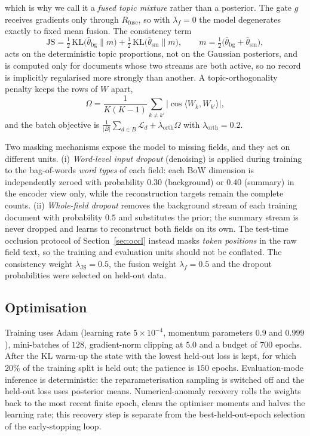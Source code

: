 \documentclass[11pt]{article}
\begin{document}
which is why we call it a \emph{fused topic mixture} rather than a posterior. The gate
$g$ receives gradients only through $R_{\mathrm{fuse}}$, so with $\lambda_f=0$ the model
degenerates exactly to fixed mean fusion. The consistency term
\begin{equation}
\mathrm{JS}=\tfrac12\,\mathrm{KL}\!\big(\bar\theta_{\mathrm{bg}}\|m\big)
+\tfrac12\,\mathrm{KL}\!\big(\bar\theta_{\mathrm{sm}}\|m\big),
\qquad m=\tfrac12\big(\bar\theta_{\mathrm{bg}}+\bar\theta_{\mathrm{sm}}\big),
\end{equation}
acts on the deterministic topic proportions, not on the Gaussian posteriors, and is computed only
for documents whose two streams are both active, so no record is implicitly regularised more
strongly than another. A topic-orthogonality penalty keeps the rows of $W$ apart,
\begin{equation}
\Omega=\frac{1}{K(K-1)}\sum_{k\neq k'}\big|\cos\langle W_k,W_{k'}\rangle\big|,
\end{equation}
and the batch objective is $\frac{1}{|B|}\sum_{d\in B}\mathcal{L}_d
+\lambda_{\mathrm{orth}}\Omega$ with $\lambda_{\mathrm{orth}}=0.2$.

Two masking mechanisms expose the model to missing fields, and they act on different units.
(i) \emph{Word-level input dropout} (denoising) is applied during training to the bag-of-words
\emph{word types} of each field: each BoW dimension is independently zeroed with probability
$0.30$ (background) or $0.40$ (summary) in the encoder view only, while the reconstruction
targets remain the complete counts. (ii) \emph{Whole-field dropout} removes the background stream
of each training document with probability $0.5$ and substitutes the prior; the summary stream is
never dropped and learns to reconstruct both fields on its own. The test-time occlusion protocol
of Section~\ref{sec:occl} instead masks \emph{token positions} in the raw field text, so the
training and evaluation units should not be conflated. The consistency weight
$\lambda_{\mathrm{JS}}=0.5$, the fusion weight $\lambda_f=0.5$ and the dropout probabilities were
selected on held-out data.

\subsection{Optimisation}

Training uses Adam (learning rate $5\times10^{-4}$, momentum parameters $0.9$ and $0.999$),
mini-batches of $128$, gradient-norm clipping at $5.0$ and a budget of $700$ epochs. After the KL
warm-up the state with the lowest held-out loss is kept, for which $20\%$ of the training split is
held out; the patience is $150$ epochs. Evaluation-mode inference is deterministic: the
reparameterisation sampling is switched off and the held-out loss uses posterior means.
Numerical-anomaly recovery rolls the weights back to the most recent finite epoch, clears the
optimiser moments and halves the learning rate; this recovery step is separate from the
best-held-out-epoch selection of the early-stopping loop.
\end{document}
